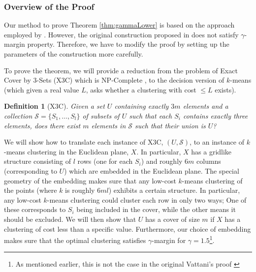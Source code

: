 \documentclass{article}
\newcommand{\mc}{\mathcal}
\newtheorem{definition}[theorem]{Definition}
\begin{document}
\subsubsection{Overview of the Proof}

Our method to prove Theorem \ref{thm:gammaLower} is based on the approach employed by \cite{vattani2009hardness}. However, the original construction proposed in \cite{vattani2009hardness} does not satisfy $\gamma$-margin property. Therefore, we have to modify the proof by setting up the parameters of the construction more carefully. 



To prove the theorem, we will provide a reduction from the problem of Exact Cover by 3-Sets (X3C) which is NP-Complete \cite{garey2002computers}, to the decision version of $k$-means (which given a real value $L$, asks whether a clustering with cost $\le L$ exists).

\begin{definition}[X3C]
Given a set $U$ containing exactly $3m$ elements and a collection $\mc S = \{S_1, \ldots, S_l\}$ of subsets of $U$ such that each $S_i$ contains exactly three elements, does there exist $m$ elements in $\mc S$ such that their union is $U$? 
\end{definition}

We will show how to translate each instance of X3C, $(U,\mc S)$, to an instance of $k$-means clustering in the Euclidean plane, $X$. In particular, $X$ has a gridlike structure consisting of $l$ rows (one for each $S_i$) and roughly $6m$ columns (corresponding to $U$) which are embedded in the Euclidean plane. The special geometry of the embedding makes sure that any low-cost $k$-means clustering of the points (where $k$ is roughly $6ml$) exhibits a certain structure. In particular, any low-cost $k$-means clustering could cluster each row in only two ways; One of these corresponds to $S_i$ being included in the cover, while the other means it should be excluded. We will then show that $U$ has a cover of size $m$ if $X$ has a clustering of cost less than a specific value. Furthermore, our choice of embedding makes sure that the optimal clustering satisfies $\gamma$-margin for $\gamma=1.5$\footnote{As mentioned earlier, this is not the case in the original Vattani's proof \cite{vattani2009hardness}}.
\end{document}
